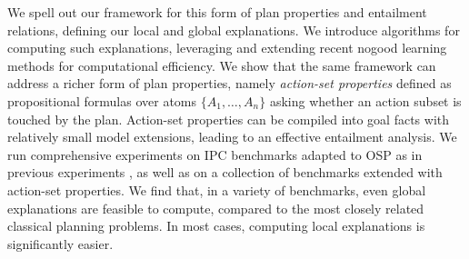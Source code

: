 We spell out our framework for this form of plan properties and
entailment relations, defining our local and global explanations. We
introduce algorithms for computing such explanations, leveraging and
extending recent nogood learning methods
\cite{steinmetz:hoffmann:ai-17,steinmetz:hoffmann:ijcai-17} for
computational efficiency. We show that the same framework can address
a richer form of plan properties, namely \emph{action-set properties}
defined as propositional formulas over atoms $\{A_1, \dots, A_n\}$
asking whether an action subset is touched by the plan. Action-set
properties can be compiled into goal facts with relatively small model
extensions, leading to an effective entailment analysis. We run
comprehensive experiments on IPC benchmarks adapted to OSP as in
previous experiments \cite{domshlak:mirkis:jair-15}, as well as on a
collection of benchmarks extended with action-set properties. We find
that, in a variety of benchmarks, even global explanations are
feasible to compute, compared to the most closely related classical
planning problems. In most cases, computing local explanations is
significantly easier.





















